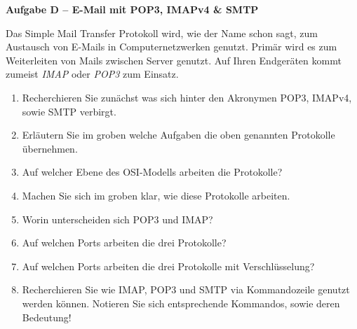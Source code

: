 \documentclass[paper=a4,fontsize=11pt]{scrartcl}%
\numberwithin{equation}{section}
\begin{document}
\begin{center}\Large{\textbf{Aufgabe D -- E-Mail mit POP3, IMAPv4 \& SMTP}}\end{center}\vskip0.25in
Das Simple Mail Transfer Protokoll wird, wie der Name schon sagt, zum Austausch von E-Mails in Computernetzwerken genutzt. Primär wird es zum Weiterleiten von Mails zwischen Server genutzt. Auf Ihren Endgeräten kommt zumeist \emph{IMAP} oder \emph{POP3} zum Einsatz. 
\begin{enumerate}
	\item Recherchieren Sie zunächst was sich hinter den Akronymen POP3, IMAPv4, sowie SMTP verbirgt.
	\item Erläutern Sie im groben welche Aufgaben die oben genannten Protokolle übernehmen.
	\item Auf welcher Ebene des OSI-Modells arbeiten die Protokolle?
	\item Machen Sie sich im groben klar, wie diese Protokolle arbeiten.	
	\item Worin unterscheiden sich POP3 und IMAP?
	\item Auf welchen Ports arbeiten die drei Protokolle?
	\item Auf welchen Ports arbeiten die drei Protokolle mit Verschlüsselung?
	\item Recherchieren Sie wie IMAP, POP3 und SMTP via Kommandozeile genutzt werden können. Notieren Sie sich entsprechende Kommandos, sowie deren Bedeutung!
\end{enumerate}
\end{document}
